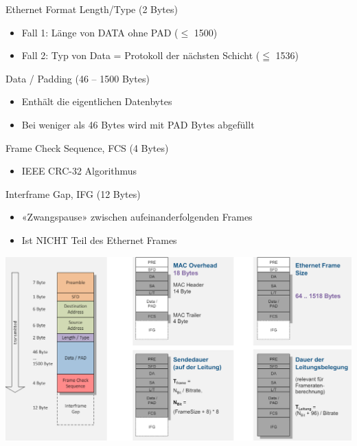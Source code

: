 \begin{definition}{Ethernet Format}
    Length/Type (2 Bytes)
    \begin{itemize}
        \item Fall 1: Länge von DATA ohne PAD ($\leq$ 1500)
        \item Fall 2: Typ von Data = Protokoll der nächsten Schicht ($\leqq$ 1536)
    \end{itemize}
    Data / Padding (46 – 1500 Bytes)
    \begin{itemize}
        \item Enthält die eigentlichen Datenbytes
        \item Bei weniger als 46 Bytes wird mit PAD Bytes abgefüllt
    \end{itemize}
    Frame Check Sequence, FCS (4 Bytes)
    \begin{itemize}
        \item IEEE CRC-32 Algorithmus
    \end{itemize}
    Interframe Gap, IFG (12 Bytes)
    \begin{itemize}
        \item «Zwangspause» zwischen aufeinanderfolgenden Frames
        \item Ist NICHT Teil des Ethernet Frames
    \end{itemize}
    \vspace{2mm}
            \includegraphics[width=1\linewidth]{images/ethernet_format.png}
\end{definition}

